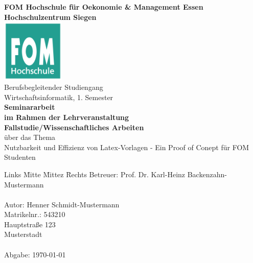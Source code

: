 \documentclass[12pt,oneside,titlepage]{scrartcl}
\newcommand{\myAutor}{Henner Schmidt-Mustermann} %
\newcommand{\myAdresse}{Hauptstra\ss e 123 \\ \> \> \> 57072 Musterstadt} %
\newcommand{\myTitel}{Nutzbarkeit und Effizienz von Latex-Vorlagen - Ein Proof of Conept für FOM Studenten} %
\newcommand{\myBetreuer}{Prof. Dr. Karl-Heinz Backenzahn-Mustermann} %
\newcommand{\myLehrveranstaltung}{Fallstudie/Wissenschaftliches Arbeiten} %
\newcommand{\myMatrikelNr}{543210} %
\newcommand{\myAbgabeDatum}{\today} %
\newcommand{\mySemesterZahl}{1} %
\newcommand{\myHochschulName}{FOM Hochschule für Oekonomie \& Management Essen} %
\newcommand{\myHochschulStandort}{Siegen} %
\newcommand{\myStudiengang}{Wirtschaftsinformatik} %
\newcommand{\myThesisArt}{Seminararbeit} %
\newcommand{\myAkademischerGrad}{Bachelor of Science (B. Sc.)} %
\begin{document}

\renewcommand{\refname}{Literaturverzeichnis}		%

\begin{titlepage} %
	\begin{center}
		\textbf{\myHochschulName}\\
		\textbf{Hochschulzentrum \myHochschulStandort}\\
		\vspace{1.5cm}
			\includegraphics[width=3cm]{media/fomLogo} \\
		\vspace{1.5cm}
		Berufsbegleitender Studiengang\\
		\myStudiengang, \mySemesterZahl. Semester\\
		\vspace{2cm}
		\textbf{\myThesisArt}\\
		\textbf{im Rahmen der Lehrveranstaltung}\\
		\textbf{\myLehrveranstaltung}\\
		\vspace{2cm}
		über das Thema\\
		\Large{\myTitel}\\
		\vspace{0.2cm}
	\end{center}
	\normalsize
	\vfill
	\begin{tabbing}
		Links \= Mitte \=Mittez \= Rechts\kill
		Betreuer: \> \> \>\myBetreuer\\
		\> \> \\
		Autor: \> \> \> \myAutor\\
		\> \> \>  Matrikelnr.: \myMatrikelNr\\
		\> \> \> \myAdresse\\
		\> \> \>  \\
		Abgabe: \> \> \> \myAbgabeDatum
	\end{tabbing}
\end{titlepage}
\end{document}
